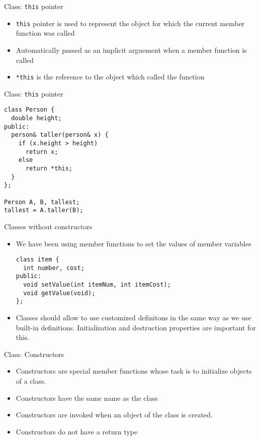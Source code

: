 \documentclass{beamer}
\begin{document}
\begin{frame}[fragile]{Class: \texttt{this} pointer}
  \begin{itemize}
  \item \texttt{this} pointer is used to represent the object for which the current member function was called\pause
  \item Automatically passed as an implicit arguement when a member function is called\pause
  \item \texttt{*this} is the reference to the object which called the function
  \end{itemize}
\end{frame}

\begin{frame}[fragile]{Class: \texttt{this} pointer}
  \begin{lstlisting}
class Person {
  double height;
public:
  person& taller(person& x) {
    if (x.height > height) 
      return x;
    else
      return *this;
  }
};

Person A, B, tallest;
tallest = A.taller(B);
  \end{lstlisting}
\end{frame}

\begin{frame}[fragile]{Classes without constructors}
  \begin{itemize}
  \item We have been using member functions to set the values of member variables
    \begin{lstlisting}
class item {
  int number, cost;
public:
  void setValue(int itemNum, int itemCost);
  void getValue(void);
};      
    \end{lstlisting}\pause
  \item Classes should allow to use customized definitons in the same way as we use built-in definitions. Initialization and destruction properties are important for this.
  \end{itemize}
\end{frame}

\begin{frame}[fragile]{Class: Constructors}
  \begin{itemize}
  \item Constructors are special member functions whose task is to initialize objects of a class.\pause
  \item Constructors have the same name as the class\pause
  \item Constructors are invoked when an object of the class is created.\pause
  \item Constructors do not have a return type
  \end{itemize}
\end{frame}
\end{document}
